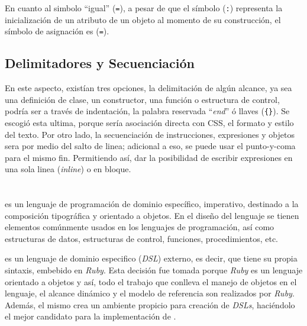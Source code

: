 \documentclass[12pt,letterpaper,titlepage,oneside,openright]{book}
\newcommand{\OhTeX}{%
    \makebox[0.76em][c]{O}%
    \makebox[0.25em][c]{%
        \raisebox{0.14em}[0em][0em]{%
            \fontsize{0.5em}{0cm}%
                \selectfont H%
        }%
    }%
    \makebox[1.35em][c]{\TeX}%
}
\newcommand{\ohtex}{\OhTeX\xspace}
\newcommand{\ruby}{\textit{Ruby}\xspace}
\newcommand{\ttcode}[1]{(\texttt{#1})}
\begin{document}
En cuanto al simbolo ``igual'' (\texttt{=}), a pesar de que el símbolo (\texttt{:}) representa la inicialización de un
atributo de un objeto al momento de su construcción, el símbolo de asignación es
(\texttt{=}).

\section{Delimitadores y Secuenciación}

En este aspecto, existían tres opciones, la delimitación de algún alcance, ya
sea una definición de clase, un constructor, una función o estructura de control,
podría ser a través de indentación, la palabra reservada ``\textit{end}'' ó llaves
\ttcode{\{\}}. Se escogió esta ultima, porque sería asociación directa con CSS,
el formato y estilo del texto. Por otro lado, la secuenciación de instrucciones,
expresiones y objetos sera por medio del salto de linea; adicional a eso, se puede
usar el punto-y-coma para el mismo fin. Permitiendo así, dar la posibilidad de
escribir expresiones en una sola linea (\textit{inline}) o en bloque.



%

\chapter[OhTeX]{\ohtex}

\ohtex es un lenguaje de programación de dominio específico, imperativo,
destinado a la composición tipográfica y orientado a objetos. En el diseño del
lenguaje se tienen elementos comúnmente usados en los lenguajes de programación,
así como estructuras de datos, estructuras de control, funciones,
procedimientos, etc.

\ohtex es un lenguaje de dominio especifico (\textit{DSL}) externo, es decir,
que tiene su propia sintaxis, embebido en \ruby. Esta decisión fue tomada porque
\ruby es un lenguaje orientado a objetos y así, todo el trabajo que conlleva el
manejo de objetos en el lenguaje, el alcance dinámico y el modelo de referencia
son realizados por \ruby. Además, el mismo crea un ambiente propicio para creación de
\textit{DSLs}, haciéndolo el mejor candidato para la implementación de \ohtex.
\end{document}
